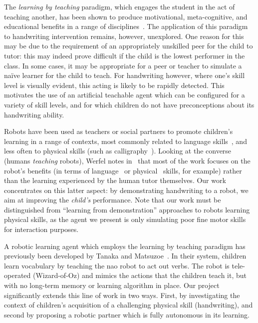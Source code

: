 \documentclass{article}
\begin{document}
The \emph{learning by teaching} paradigm, which engages the student in the act
of teaching another, has been shown to produce motivational, meta-cognitive, and
educational benefits in a range of disciplines~\cite{Rohrbeck2003}. The
application of this paradigm to handwriting intervention remains, however,
unexplored. One reason for this may be due to the requirement of an
appropriately unskilled peer for the child to tutor: this may indeed prove
difficult if the child is the lowest performer in the class.  In some cases, it
may be appropriate for a peer or teacher to simulate a na\"ive learner for the
child to teach. For handwriting however, where one's skill level is visually
evident, this acting is likely to be rapidly detected. This motivates the use of
an artificial teachable agent which can be configured for a variety of skill
levels, and for which children do not have preconceptions about its handwriting
ability.

Robots have been used as teachers or social partners to promote children's
learning in a range of contexts, most commonly related to language
skills~\cite{han2010robot}, and less often to physical skills (such as
calligraphy~\cite{Matsui2013}). Looking at the converse (humans \emph{teaching}
robots), Werfel notes in~\cite{Werfel2014} that most of the work focuses on the
robot's benefits (in terms of language~\cite{Saunders2010} or
physical~\cite{Mulling2013} skills, for example) rather than the learning
experienced by the human tutor themselves.  Our work concentrates on this latter
aspect: by demonstrating handwriting to a robot, we aim at improving the
\emph{child's} performance. Note that our work must be distinguished from
``learning from demonstration'' approaches to robots learning physical skills,
as the agent we present is only simulating poor fine motor skills for interaction
purposes.

A robotic learning agent which employs the learning by teaching paradigm has
previously been developed by Tanaka and Matsuzoe~\cite{Tanaka2012}. In their
system, children learn vocabulary by teaching the {\sc nao} robot to act out
verbs. The robot is tele-operated (Wizard-of-Oz) and mimics the actions that the
children teach it, but with no long-term memory or learning algorithm in place.
Our project significantly extends this line of work in two ways. First, by
investigating the context of children's acquisition of a challenging physical
skill (handwriting), and second by proposing a robotic partner which is fully
autonomous in its learning.
\end{document}
